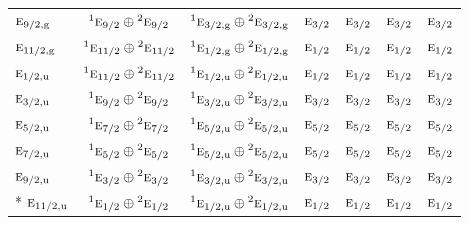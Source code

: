 \documentclass[10pt,a4paper]{article}
\numberwithin{equation}{section}
\newcommand{\irr}[1]{\text{\normalfont\scshape #1}}
\newcommand{\conjpair}[1]{{}^{#1}}
\newcommand{\ptag}[1]{\mathrm{#1}}
\begin{document}
{\begin{longtable}{@{}lcccccc@{}}
$\irr{e}_{9/2,\ptag{g}}$ & $\conjpair{1}\irr{e}_{9/2}\oplus \conjpair{2}\irr{e}_{9/2}$ & $\conjpair{1}\irr{e}_{3/2,\ptag{g}}\oplus \conjpair{2}\irr{e}_{3/2,\ptag{g}}$ & $\irr{e}_{3/2}$ & $\irr{e}_{3/2}$ & $\irr{e}_{3/2}$ & $\irr{e}_{3/2}$\\
$\irr{e}_{11/2,\ptag{g}}$ & $\conjpair{1}\irr{e}_{11/2}\oplus \conjpair{2}\irr{e}_{11/2}$ & $\conjpair{1}\irr{e}_{1/2,\ptag{g}}\oplus \conjpair{2}\irr{e}_{1/2,\ptag{g}}$ & $\irr{e}_{1/2}$ & $\irr{e}_{1/2}$ & $\irr{e}_{1/2}$ & $\irr{e}_{1/2}$\\
$\irr{e}_{1/2,\ptag{u}}$ & $\conjpair{1}\irr{e}_{11/2}\oplus \conjpair{2}\irr{e}_{11/2}$ & $\conjpair{1}\irr{e}_{1/2,\ptag{u}}\oplus \conjpair{2}\irr{e}_{1/2,\ptag{u}}$ & $\irr{e}_{1/2}$ & $\irr{e}_{1/2}$ & $\irr{e}_{1/2}$ & $\irr{e}_{1/2}$\\
$\irr{e}_{3/2,\ptag{u}}$ & $\conjpair{1}\irr{e}_{9/2}\oplus \conjpair{2}\irr{e}_{9/2}$ & $\conjpair{1}\irr{e}_{3/2,\ptag{u}}\oplus \conjpair{2}\irr{e}_{3/2,\ptag{u}}$ & $\irr{e}_{3/2}$ & $\irr{e}_{3/2}$ & $\irr{e}_{3/2}$ & $\irr{e}_{3/2}$\\
$\irr{e}_{5/2,\ptag{u}}$ & $\conjpair{1}\irr{e}_{7/2}\oplus \conjpair{2}\irr{e}_{7/2}$ & $\conjpair{1}\irr{e}_{5/2,\ptag{u}}\oplus \conjpair{2}\irr{e}_{5/2,\ptag{u}}$ & $\irr{e}_{5/2}$ & $\irr{e}_{5/2}$ & $\irr{e}_{5/2}$ & $\irr{e}_{5/2}$\\
$\irr{e}_{7/2,\ptag{u}}$ & $\conjpair{1}\irr{e}_{5/2}\oplus \conjpair{2}\irr{e}_{5/2}$ & $\conjpair{1}\irr{e}_{5/2,\ptag{u}}\oplus \conjpair{2}\irr{e}_{5/2,\ptag{u}}$ & $\irr{e}_{5/2}$ & $\irr{e}_{5/2}$ & $\irr{e}_{5/2}$ & $\irr{e}_{5/2}$\\
$\irr{e}_{9/2,\ptag{u}}$ & $\conjpair{1}\irr{e}_{3/2}\oplus \conjpair{2}\irr{e}_{3/2}$ & $\conjpair{1}\irr{e}_{3/2,\ptag{u}}\oplus \conjpair{2}\irr{e}_{3/2,\ptag{u}}$ & $\irr{e}_{3/2}$ & $\irr{e}_{3/2}$ & $\irr{e}_{3/2}$ & $\irr{e}_{3/2}$\\*
$\irr{e}_{11/2,\ptag{u}}$ & $\conjpair{1}\irr{e}_{1/2}\oplus \conjpair{2}\irr{e}_{1/2}$ & $\conjpair{1}\irr{e}_{1/2,\ptag{u}}\oplus \conjpair{2}\irr{e}_{1/2,\ptag{u}}$ & $\irr{e}_{1/2}$ & $\irr{e}_{1/2}$ & $\irr{e}_{1/2}$ & $\irr{e}_{1/2}$\\
\bottomrule\end{longtable}}
\end{document}
